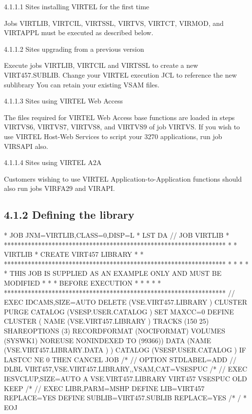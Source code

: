 \documentclass[letterpaper,10pt,english]{sphinxmanual}
\begin{document}
4.1.1.1 Sites installing VIRTEL for the first time

Jobs VIRTLIB, VIRTCIL, VIRTSSL, VIRTVS, VIRTCT, VIRMOD, and VIRTAPPL must be executed as described below.

4.1.1.2 Sites upgrading from a previous version

Execute jobs VIRTLIB, VIRTCIL and VIRTSSL to create a new VIRT457.SUBLIB. Change your VIRTEL execution JCL to reference the new sublibrary You can retain your existing VSAM files.

4.1.1.3 Sites using VIRTEL Web Access

The files required for VIRTEL Web Access base functions are loaded in steps VIRTVS6, VIRTVS7, VIRTVS8, and VIRTVS9 of job VIRTVS. If you wish to use VIRTEL Host-Web Services to script your 3270 applications, run job VIRSAPI also.

4.1.1.4 Sites using VIRTEL A2A

Customers wishing to use VIRTEL Application-to-Application functions should also run jobs VIRFA29 and VIRAPI.


\subsection{4.1.2 Defining the library}
\label{\detokenize{Installation_Guide:defining-the-library}}
\begin{sphinxVerbatim}[commandchars=\\\{\}]
* \PYGZdl{}\PYGZdl{} JOB JNM=VIRTLIB,CLASS=0,DISP=L
* \PYGZdl{}\PYGZdl{} LST DA
// JOB VIRTLIB
* *****************************************************************
* * VIRTLIB * CREATE VIRT457 LIBRARY                              *
* *****************************************************************
* *                                                               *
* * THIS JOB IS SUPPLIED AS AN EXAMPLE ONLY AND MUST BE MODIFIED  *
* * BEFORE EXECUTION                                              *
* *                                                               *
* *****************************************************************
// EXEC IDCAMS,SIZE=AUTO
 DELETE (VSE.VIRT457.LIBRARY ) \PYGZhy{}
          CLUSTER \PYGZhy{}
          PURGE \PYGZhy{}
    CATALOG (VSESP.USER.CATALOG )
 SET MAXCC=0
 DEFINE CLUSTER ( \PYGZhy{}
            NAME (VSE.VIRT457.LIBRARY ) \PYGZhy{}
            TRACKS (150 25) \PYGZhy{}
            SHAREOPTIONS (3) \PYGZhy{}
            RECORDFORMAT (NOCIFORMAT) \PYGZhy{}
            VOLUMES (SYSWK1) \PYGZhy{}
            NOREUSE \PYGZhy{}
            NONINDEXED \PYGZhy{}
            TO (99366)) \PYGZhy{}
            DATA (NAME (VSE.VIRT457.LIBRARY.DATA ) ) \PYGZhy{}
            CATALOG (VSESP.USER.CATALOG )
 IF LASTCC NE 0 THEN CANCEL JOB
/*
// OPTION STDLABEL=ADD
// DLBL VIRT457,\PYGZsq{}VSE.VIRT457.LIBRARY\PYGZsq{},,VSAM,CAT=VSESPUC
/*
// EXEC IESVCLUP,SIZE=AUTO
A VSE.VIRT457.LIBRARY        VIRT457 VSESPUC OLD KEEP
/*
// EXEC LIBR,PARM=\PYGZsq{}MSHP\PYGZsq{}
              DEFINE LIB=VIRT457 REPLACE=YES
              DEFINE SUBLIB=VIRT457.SUBLIB REPLACE=YES
/*
/\PYGZam{}
* \PYGZdl{}\PYGZdl{} EOJ
\end{sphinxVerbatim}
\end{document}
